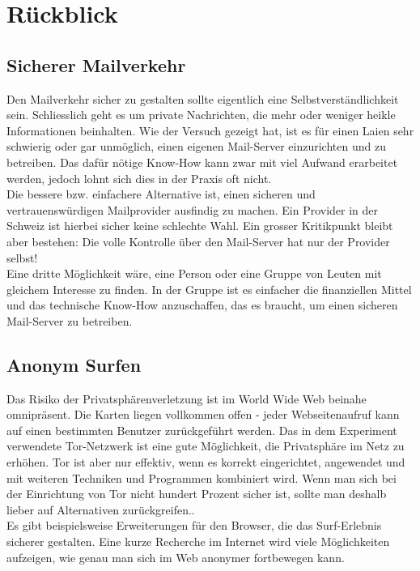 \section{Rückblick}

\subsection{Sicherer Mailverkehr}
Den Mailverkehr sicher zu gestalten sollte eigentlich eine Selbstverständlichkeit sein. Schliesslich geht es um private Nachrichten, die mehr oder weniger heikle Informationen beinhalten.
Wie der Versuch gezeigt hat, ist es für einen Laien sehr schwierig oder gar unmöglich, einen eigenen Mail-Server einzurichten und zu betreiben.
Das dafür nötige Know-How kann zwar mit viel Aufwand erarbeitet werden, jedoch lohnt sich dies in der Praxis oft nicht. 
\\
Die bessere bzw. einfachere Alternative ist, einen sicheren und vertrauenswürdigen Mailprovider ausfindig zu machen. 
Ein Provider in der Schweiz ist hierbei sicher keine schlechte Wahl. 
Ein grosser Kritikpunkt bleibt aber bestehen: Die volle Kontrolle über den Mail-Server hat nur der Provider selbst!
\\
Eine dritte Möglichkeit wäre, eine Person oder eine Gruppe von Leuten mit gleichem Interesse zu finden. In der Gruppe ist es einfacher die finanziellen Mittel und das technische Know-How anzuschaffen, das es braucht, um einen sicheren Mail-Server zu betreiben.

\subsection{Anonym Surfen}
Das Risiko der Privatsphärenverletzung ist im World Wide Web beinahe omnipräsent. 
Die Karten liegen vollkommen offen - jeder Webseitenaufruf kann auf einen bestimmten Benutzer zurückgeführt werden.
Das in dem Experiment verwendete Tor-Netzwerk ist eine gute Möglichkeit, die Privatsphäre im Netz zu erhöhen.
Tor ist aber nur effektiv, wenn es korrekt eingerichtet, angewendet und mit weiteren Techniken und Programmen kombiniert wird.
Wenn man sich bei der Einrichtung von Tor nicht hundert Prozent sicher ist, sollte man deshalb lieber auf Alternativen zurückgreifen..
\\
Es gibt beispielsweise Erweiterungen für den Browser, die das Surf-Erlebnis sicherer gestalten. Eine kurze Recherche im Internet wird viele Möglichkeiten aufzeigen, wie genau man sich im Web anonymer fortbewegen kann.

